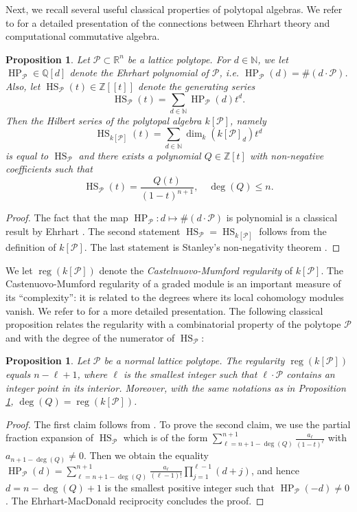 \documentclass[12pt]{article}
\numberwithin{equation}{section}
\numberwithin{theorem}{section}
\newtheorem{proposition}[theorem]{Proposition}
\newcommand{\Z}{\mathbb{Z}}
\DeclareMathOperator{\HP}{HP}
\DeclareMathOperator{\HS}{HS}
\newcommand{\polytope}{\mathscr P}
\DeclareMathOperator{\reg}{reg}
\newcommand{\R}{\mathbb{R}}
\newcommand{\N}{\mathbb{N}}
\newcommand{\Q}{\mathbb{Q}}
\begin{document}
Next, we recall several useful classical properties of polytopal algebras. We refer to \cite[Ch.~12]{MilStu05} for a detailed presentation of the connections between Ehrhart theory and computational commutative algebra.
\begin{proposition}\label{prop:HSpolytope}
Let $\polytope\subset \R^n$ be a lattice polytope. For $d\in\N$, we
let $\HP_\polytope\in\Q[d]$ denote the \emph{Ehrhart polynomial} of
$\polytope$, \emph{i.e.} $\HP_\polytope(d)=\#(d\cdot\polytope)$. Also, let $\HS_\polytope(t)\in\Z[[t]]$ denote the generating series
$$\HS_\polytope(t)=\sum_{d\in \N}\HP_\polytope(d) t^d.$$
Then the Hilbert series of the polytopal algebra $k[\polytope]$, namely
$$\HS_{k[\polytope]}(t)=\sum_{d\in\N}\dim_k (k[\polytope]_d)t^d$$
is equal to $\HS_\polytope$ and there exists a polynomial $Q\in \Z[t]$ with non-negative coefficients such that
$$\HS_{\polytope}(t)=\dfrac{Q(t)}{(1-t)^{n+1}},\quad\deg(Q)\leq n.$$
\end{proposition}

\begin{proof}
The fact that the map $\HP_\polytope: d\mapsto \#(d\cdot\polytope)$ is polynomial is a classical result by Ehrhart \cite{ehrhart1962polyedres}. The second statement $\HS_\polytope=\HS_{k[\polytope]}$ follows from the definition of $k[\polytope]$. The last statement is Stanley's non-negativity theorem \cite[Thm.~2.1]{stanley1980decompositions}.
\end{proof}

We let $\reg(k[\polytope])$ denote the \emph{Castelnuovo-Mumford regularity} of $k[\polytope]$. The Castenuovo-Mumford regularity of a graded module is an important measure of its ``complexity'': it is related to the degrees where its local cohomology modules vanish. We refer to \cite[Ch.~15]{brodmann2012local} for a more detailed presentation. The following classical proposition relates the regularity with a combinatorial property of the polytope $\polytope$ and with the degree of the numerator of $\HS_\polytope$:

\begin{proposition}\label{prop:regpolytope}
Let $\polytope$ be a normal lattice polytope.  The regularity
$\reg(k[\polytope])$ equals $n-\ell+1$, where $\ell$ is the
smallest integer such that $\ell\cdot \polytope$ contains an integer
point in its interior. Moreover, with the same notations as
in Proposition \ref{prop:HSpolytope}, $\deg(Q)=\reg(k[\polytope])$.
\end{proposition}
\begin{proof}
The first claim follows from \cite[Sec.~5.4]{bruns1997normal}. To prove the second claim, we use the partial fraction expansion of $\HS_\polytope$ which is of the form $\sum_{\ell=n+1-\deg(Q)}^{n+1}\frac{a_\ell}{(1-t)^\ell}$ with $a_{n+1-\deg(Q)}\neq 0$. Then we obtain the equality $\HP_\polytope(d)=\sum_{\ell=n+1-\deg(Q)}^{n+1}\frac{a_\ell}{(\ell-1)!}\prod_{j=1}^{\ell-1}(d+j)$, and hence $d=n-\deg(Q)+1$ is the smallest positive integer such that $\HP_\polytope(-d)\neq 0$.
The Ehrhart-MacDonald reciprocity \cite{Mac71} concludes the proof.
\end{proof}
\end{document}
